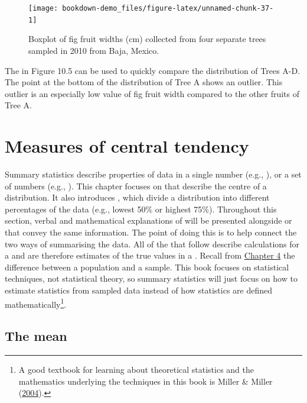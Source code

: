 \documentclass[
  openany]{krantz}
\begin{document}
\begin{figure}
\texttt{[image: bookdown-demo\_files/figure-latex/unnamed-chunk-37-1]} \caption{Boxplot of fig fruit widths (cm) collected from four separate trees sampled in 2010 from Baja, Mexico.}\label{fig:unnamed-chunk-37}
\end{figure}

The  in Figure 10.5 can be used to quickly compare the distribution of Trees A-D.
The point at the bottom of the distribution of Tree A shows an outlier.
This outlier is an especially low value of fig fruit width compared to the other fruits of Tree A.

\hypertarget{Chapter_11}{%
\chapter{Measures of central tendency}\label{Chapter_11}}

Summary statistics describe properties of data in a single number (e.g., ), or a set of numbers (e.g., ).
This chapter focuses on  that describe the centre of a distribution.
It also introduces , which divide a distribution into different percentages of the data (e.g., lowest 50\% or highest 75\%).
Throughout this section, verbal and mathematical explanations of  will be presented alongside  or  that convey the same information.
The point of doing this is to help connect the two ways of summarising the data.
All of the  that follow describe calculations for a \emph{} and are therefore estimates of the true values in a \emph{}.
Recall from \protect\hyperlink{Chapter_4}{Chapter 4} the difference between a population and a sample.
This book focuses on statistical techniques, not statistical theory, so summary statistics will just focus on how to estimate statistics from sampled data instead of how statistics are defined mathematically\footnote{A good textbook for learning about theoretical statistics and the mathematics underlying the techniques in this book is Miller \& Miller (\protect\hyperlink{ref-Miller2004}{2004}).}.

\hypertarget{the-mean}{%
\section{The mean}\label{the-mean}}
\end{document}
